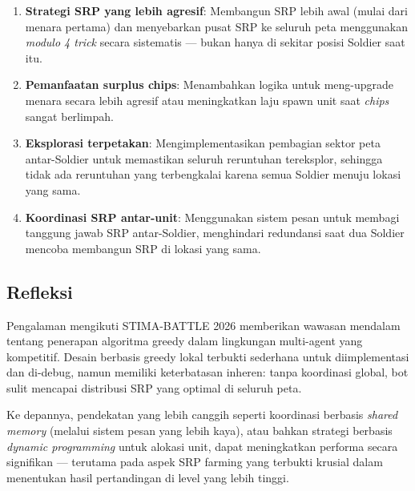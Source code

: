 \documentclass[12pt, a4paper]{article}
\begin{document}
\begin{enumerate}
    \item \textbf{Strategi SRP yang lebih agresif}: Membangun SRP lebih awal
          (mulai dari menara pertama) dan menyebarkan pusat SRP ke seluruh peta
          menggunakan \textit{modulo 4 trick} secara sistematis --- bukan hanya di
          sekitar posisi Soldier saat itu.
    \item \textbf{Pemanfaatan surplus chips}: Menambahkan logika untuk meng-upgrade
          menara secara lebih agresif atau meningkatkan laju spawn unit saat
          \textit{chips} sangat berlimpah.
    \item \textbf{Eksplorasi terpetakan}: Mengimplementasikan pembagian sektor peta
          antar-Soldier untuk memastikan seluruh reruntuhan tereksplor, sehingga
          tidak ada reruntuhan yang terbengkalai karena semua Soldier menuju lokasi
          yang sama.
    \item \textbf{Koordinasi SRP antar-unit}: Menggunakan sistem pesan untuk
          membagi tanggung jawab SRP antar-Soldier, menghindari redundansi saat
          dua Soldier mencoba membangun SRP di lokasi yang sama.
\end{enumerate}

\subsection{Refleksi}

Pengalaman mengikuti STIMA-BATTLE 2026 memberikan wawasan mendalam tentang
penerapan algoritma greedy dalam lingkungan multi-agent yang kompetitif. Desain
berbasis greedy lokal terbukti sederhana untuk diimplementasi dan di-debug, namun
memiliki keterbatasan inheren: tanpa koordinasi global, bot sulit mencapai
distribusi SRP yang optimal di seluruh peta.

Ke depannya, pendekatan yang lebih canggih seperti koordinasi berbasis
\textit{shared memory} (melalui sistem pesan yang lebih kaya), atau bahkan strategi
berbasis \textit{dynamic programming} untuk alokasi unit, dapat meningkatkan
performa secara signifikan --- terutama pada aspek SRP farming yang terbukti krusial
dalam menentukan hasil pertandingan di level yang lebih tinggi.
\end{document}
